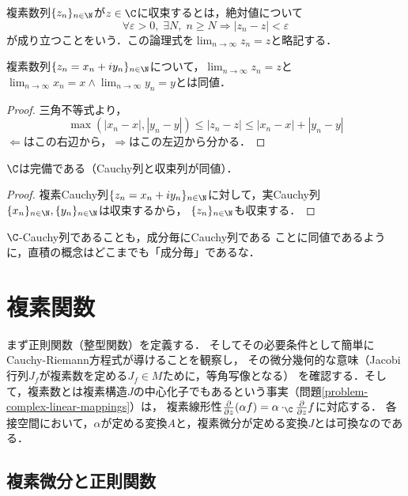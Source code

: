 \documentclass[uplatex, dvipdfmx]{jsreport}
\begin{document}
\begin{definition}[convergence]
    複素数列$\{z_n\}_{n\in\N}$が$z\in\C$に収束するとは，絶対値について
    \[ \forall\varepsilon>0,\;\exists N,\;n\ge N\Rightarrow |z_n-z|<\varepsilon \]
    が成り立つことをいう．この論理式を$\lim_{n\to\infty}z_n=z$と略記する．
\end{definition}

\begin{proposition}[$\R^2$として]
    複素数列$\{z_n=x_n+iy_n\}_{n\in\N}$について，$\lim_{n\to\infty}z_n=z$と$\lim_{n\to\infty}x_n=x\land\lim_{n\to\infty}y_n=y$とは同値．
\end{proposition}
\begin{proof}
    三角不等式より，
    \[ \max(|x_n-x|,|y_n-y|)\le |z_n-z| \le |x_n-x|+|y_n-y| \]
    $\Leftarrow$はこの右辺から，$\Rightarrow$はこの左辺から分かる．
\end{proof}

\begin{proposition}[completeness]
    $\C$は完備である（Cauchy列と収束列が同値）．
\end{proposition}
\begin{proof}
    複素Cauchy列$\{z_n=x_n+iy_n\}_{n\in\N}$に対して，実Cauchy列$\{x_n\}_{n\in\N},\{y_n\}_{n\in\N}$は収束するから，
    $\{z_n\}_{n\in\N}$も収束する．
\end{proof}
\begin{remarks}
    $\C$-Cauchy列であることも，成分毎にCauchy列である
    ことに同値であるように，直積の概念はどこまでも「成分毎」であるな．
\end{remarks}

\section{複素関数}

\begin{screen}
    まず正則関数（整型関数）を定義する．
    そしてその必要条件として簡単にCauchy-Riemann方程式が導けることを観察し，
    その微分幾何的な意味（Jacobi行列$J_f$が複素数を定める$J_f\in M$ために，等角写像となる）
    を確認する．そして，複素数とは複素構造$J$の中心化子でもあるという事実（問題\ref{problem-complex-linear-mappings}）は，
    複素線形性$\frac{\partial}{\partial z}(\alpha f)=\alpha\cdot_\C\frac{\partial}{\partial z} f$に対応する．
    各接空間において，$\alpha$が定める変換$A$と，複素微分が定める変換$J$とは可換なのである．
\end{screen}

\subsection{複素微分と正則関数}
\end{document}
